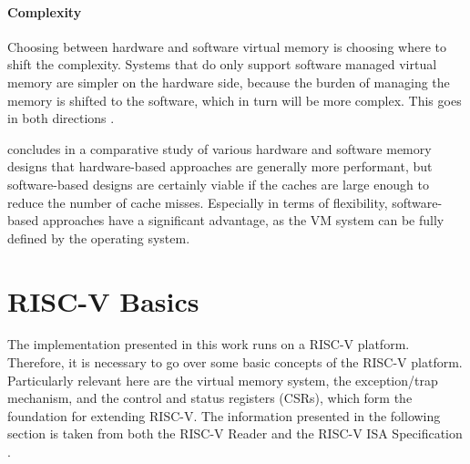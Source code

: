\paragraph{Complexity} Choosing between hardware and software virtual memory is choosing where to shift the complexity.
Systems that do only support software managed virtual memory are simpler on the hardware side, because the burden of managing the memory is shifted to the software, which in turn will be more complex.
This goes in both directions \cite{jacob1998virtualissues}.

\cite{jacob1998look} concludes in a comparative study of various hardware and software memory designs
that hardware-based approaches are generally more performant, but software-based designs are certainly
viable if the caches are large enough to reduce the number of cache misses.
Especially in terms of flexibility, software-based approaches have a significant advantage,
as the VM system can be fully defined by the operating system.








\section{RISC-V Basics}
The implementation presented in this work runs on a RISC-V platform. Therefore, it is necessary
to go over some basic concepts of the RISC-V platform. Particularly relevant here are the virtual
memory system, the exception/trap mechanism, and the control and status registers (CSRs), which
form the foundation for extending RISC-V.
The information presented in the following section is taken from both the RISC-V Reader \cite{riscvreader} and the RISC-V ISA Specification \cite{RISCVInstructionSet}.

